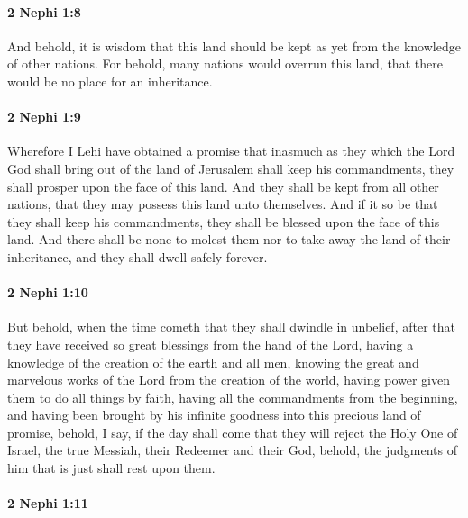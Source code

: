 		\paragraph{2 Nephi 1:8} %
			\label{2NEPHI-1-8}

			And behold, it is wisdom that this land should be kept
			as yet from the knowledge of other nations.
			For behold, many nations would overrun this land,
			that there would be no place for an inheritance.

		\paragraph{2 Nephi 1:9} %
			\label{2NEPHI-1-9}

			Wherefore I Lehi have obtained a promise that
			inasmuch as they which the Lord God shall bring out of the land of Jerusalem
			shall keep his commandments,
			they shall prosper upon the face of this land.
			And they shall be kept from all other nations,
			that they may possess this land unto themselves.
			And if it so be that they shall keep his commandments,
			they shall be blessed upon the face of this land.
			And there shall be none to molest them
			nor to take away the land of their inheritance,
			and they shall dwell safely forever.

		\paragraph{2 Nephi 1:10} %
			\label{2NEPHI-1-10}

			But behold, when the time cometh
			that they shall dwindle in unbelief,
			after that they have received so great blessings from the hand of the Lord,
			having a knowledge of the creation of the earth and all men,
			knowing the great and marvelous works of the Lord
			from the creation of the world,
			having power given them to do all things by faith,
			having all the commandments from the beginning,
			and having been brought by his infinite goodness
			into this precious land of promise,
			behold, I say, if the day shall come
			that they will reject the Holy One of Israel,
			the true Messiah, their Redeemer and their God,
			behold, the judgments of him that is just shall rest upon them.

		\paragraph{2 Nephi 1:11} %
			\label{2NEPHI-1-11}

